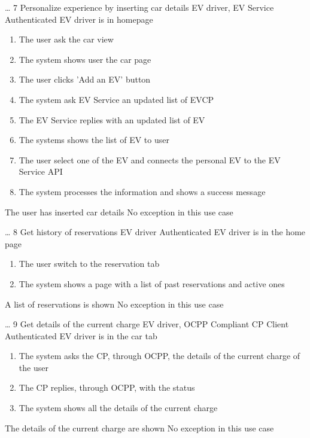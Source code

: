\usecase
{
    \dots %
}
{7}
{Personalize experience by inserting car details}
{EV driver, EV Service}
{Authenticated EV driver is in homepage}
{
    \begin{enumerate}
        \item The user ask the car view
        \item The system shows user the car page
        \item The user clicks 'Add an EV' button
        \item The system ask EV Service an updated list of EVCP
        \item The EV Service replies with an updated list of EV
        \item The systems shows the list of EV to user
        \item The user select one of the EV and connects the personal EV to the EV Service API
        \item The system processes the information and shows a success message
    \end{enumerate}
}
{The user has inserted car details}
{
    No exception in this use case
}
{
}

\usecase
{
    \dots %
}
{8}
{Get history of reservations}
{EV driver}
{Authenticated EV driver is in the home page}
{
    \begin{enumerate}
        \item The user switch to the reservation tab
        \item The system shows a page with a list of past reservations and active ones
    \end{enumerate}
}
{A list of reservations is shown}
{
    No exception in this use case
}
{
}

\usecase
{
    \dots %
}
{9}
{Get details of the current charge}
{EV driver, OCPP Compliant CP Client}
{Authenticated EV driver is in the car tab}
{
    \begin{enumerate}
        \item The system asks the CP, through OCPP, the details of the current charge of the user
        \item The CP replies, through OCPP, with the status
        \item The system shows all the details of the current charge
    \end{enumerate}
}
{The details of the current charge are shown}
{
    No exception in this use case
}
{
}

